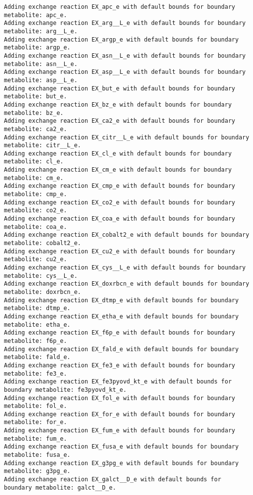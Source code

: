 \documentclass[
  letterpaper,
  DIV=11,
  numbers=noendperiod]{scrartcl}
\begin{document}
\begin{verbatim}
Adding exchange reaction EX_apc_e with default bounds for boundary metabolite: apc_e.
Adding exchange reaction EX_arg__L_e with default bounds for boundary metabolite: arg__L_e.
Adding exchange reaction EX_argp_e with default bounds for boundary metabolite: argp_e.
Adding exchange reaction EX_asn__L_e with default bounds for boundary metabolite: asn__L_e.
Adding exchange reaction EX_asp__L_e with default bounds for boundary metabolite: asp__L_e.
Adding exchange reaction EX_but_e with default bounds for boundary metabolite: but_e.
Adding exchange reaction EX_bz_e with default bounds for boundary metabolite: bz_e.
Adding exchange reaction EX_ca2_e with default bounds for boundary metabolite: ca2_e.
Adding exchange reaction EX_citr__L_e with default bounds for boundary metabolite: citr__L_e.
Adding exchange reaction EX_cl_e with default bounds for boundary metabolite: cl_e.
Adding exchange reaction EX_cm_e with default bounds for boundary metabolite: cm_e.
Adding exchange reaction EX_cmp_e with default bounds for boundary metabolite: cmp_e.
Adding exchange reaction EX_co2_e with default bounds for boundary metabolite: co2_e.
Adding exchange reaction EX_coa_e with default bounds for boundary metabolite: coa_e.
Adding exchange reaction EX_cobalt2_e with default bounds for boundary metabolite: cobalt2_e.
Adding exchange reaction EX_cu2_e with default bounds for boundary metabolite: cu2_e.
Adding exchange reaction EX_cys__L_e with default bounds for boundary metabolite: cys__L_e.
Adding exchange reaction EX_doxrbcn_e with default bounds for boundary metabolite: doxrbcn_e.
Adding exchange reaction EX_dtmp_e with default bounds for boundary metabolite: dtmp_e.
Adding exchange reaction EX_etha_e with default bounds for boundary metabolite: etha_e.
Adding exchange reaction EX_f6p_e with default bounds for boundary metabolite: f6p_e.
Adding exchange reaction EX_fald_e with default bounds for boundary metabolite: fald_e.
Adding exchange reaction EX_fe3_e with default bounds for boundary metabolite: fe3_e.
Adding exchange reaction EX_fe3pyovd_kt_e with default bounds for boundary metabolite: fe3pyovd_kt_e.
Adding exchange reaction EX_fol_e with default bounds for boundary metabolite: fol_e.
Adding exchange reaction EX_for_e with default bounds for boundary metabolite: for_e.
Adding exchange reaction EX_fum_e with default bounds for boundary metabolite: fum_e.
Adding exchange reaction EX_fusa_e with default bounds for boundary metabolite: fusa_e.
Adding exchange reaction EX_g3pg_e with default bounds for boundary metabolite: g3pg_e.
Adding exchange reaction EX_galct__D_e with default bounds for boundary metabolite: galct__D_e.

\end{verbatim}
\end{document}
